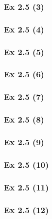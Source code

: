 \subsubsection{Ex 2.5 (3)}\label{sec:Ex_2.5.3}

\subsubsection{Ex 2.5 (4)}\label{sec:Ex_2.5.4}

\subsubsection{Ex 2.5 (5)}\label{sec:Ex_2.5.5}

\subsubsection{Ex 2.5 (6)}\label{sec:Ex_2.5.6}

\subsubsection{Ex 2.5 (7)}\label{sec:Ex_2.5.7}

\subsubsection{Ex 2.5 (8)}\label{sec:Ex_2.5.8}

\subsubsection{Ex 2.5 (9)}\label{sec:Ex_2.5.9}

\subsubsection{Ex 2.5 (10)}\label{sec:Ex_2.5.10}

\newpage		%

\subsubsection{Ex 2.5 (11)}\label{sec:Ex_2.5.11}

\subsubsection{Ex 2.5 (12)}\label{sec:Ex_2.5.12}

